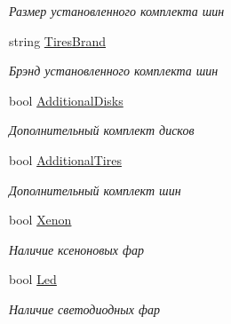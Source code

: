 \begin{DoxyCompactItemize}
\begin{DoxyCompactList}\small\item\em Размер установленного комплекта шин \end{DoxyCompactList}\item 
string \hyperlink{class_r_t_1_1_parsing_libs_1_1_models_1_1_automoto_additional_info_a4fcfe8b19f69114092298fd13e97e58d}{Tires\+Brand}
\begin{DoxyCompactList}\small\item\em Брэнд установленного комплекта шин \end{DoxyCompactList}\item 
bool \hyperlink{class_r_t_1_1_parsing_libs_1_1_models_1_1_automoto_additional_info_a45ac51d9e3328d5a21a8cc6588ef1995}{Additional\+Disks}
\begin{DoxyCompactList}\small\item\em Дополнительный комплект дисков \end{DoxyCompactList}\item 
bool \hyperlink{class_r_t_1_1_parsing_libs_1_1_models_1_1_automoto_additional_info_aeceeabef4850c5a1ca40fc64d7c3dece}{Additional\+Tires}
\begin{DoxyCompactList}\small\item\em Дополнительный комплект шин \end{DoxyCompactList}\item 
bool \hyperlink{class_r_t_1_1_parsing_libs_1_1_models_1_1_automoto_additional_info_a68c7ecf14c75d38832ff54192425f3f5}{Xenon}
\begin{DoxyCompactList}\small\item\em Наличие ксеноновых фар \end{DoxyCompactList}\item 
bool \hyperlink{class_r_t_1_1_parsing_libs_1_1_models_1_1_automoto_additional_info_a65bc3c45c143c4a649da0dff135eea8e}{Led}
\begin{DoxyCompactList}\small\item\em Наличие светодиодных фар \end{DoxyCompactList}\item 

\end{DoxyCompactItemize}
